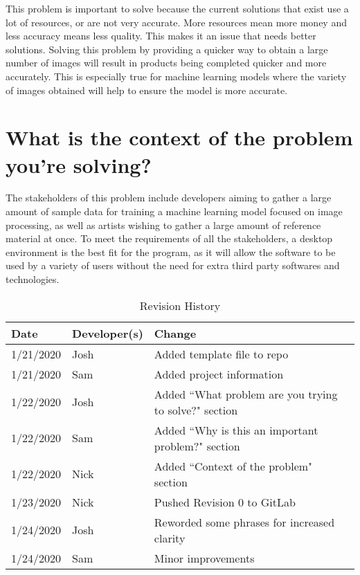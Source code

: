 \documentclass{article}
\begin{document}
This problem is important to solve because the current solutions that exist use a lot of resources, or are not very accurate. More resources mean more money and less accuracy means less quality. This makes it an issue that needs better solutions. Solving this problem by providing a quicker way to obtain a large number of images will result in products being completed quicker and more accurately. This is especially true for machine learning models where the variety of images obtained will help to ensure the model is more accurate.

\section* {What is the context of the problem you’re solving?}

The stakeholders of this problem include developers aiming to gather a large amount of sample data for training a machine learning model focused on image processing, as well as artists wishing to gather a large amount of reference material at once. To meet the requirements of all the stakeholders, a desktop environment is the best fit for the program, as it will allow the software to be used by a variety of users without the need for extra third party softwares and technologies.

\begin{table}[b]
\caption{Revision History} \label{TblRevisionHistory}
\begin{tabularx}{\textwidth}{llX}
\toprule
\textbf{Date} & \textbf{Developer(s)} & \textbf{Change}\\
\midrule
1/21/2020 & Josh & Added template file to repo\\
1/21/2020 & Sam  & Added project information\\
1/22/2020 & Josh & Added ``What problem are you trying to solve?" section\\
1/22/2020 & Sam  & Added ``Why is this an important problem?" section\\
1/22/2020 & Nick & Added ``Context of the problem" section\\
1/23/2020 & Nick & Pushed Revision 0 to GitLab\\
1/24/2020 & Josh & Reworded some phrases for increased clarity\\
1/24/2020 & Sam  & Minor improvements\\
\bottomrule
\end{tabularx}
\end{table}
\end{document}
